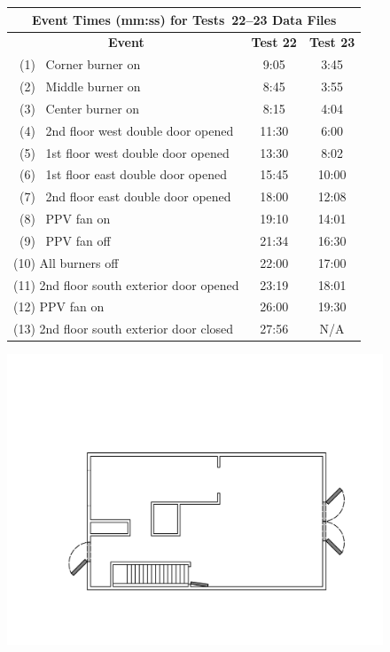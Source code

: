 \documentclass[12pt,oneside]{book}
\begin{document}
\begin{figure}[!ht]
\begin{minipage}[b]{0.8\columnwidth}
	\begin{flushleft}
	\small
	\begin{tabular}{lcc}
	\multicolumn{3}{c}{Event Times (mm:ss) for Tests~22--23 Data Files} \\
	\toprule
	\multicolumn{1}{c}{\textbf{Event}} 			& \textbf{Test 22}	& \textbf{Test 23} \\
	\midrule
	~(1)~  Corner burner on 					& 	9:05 			&	 3:45		\\
	~(2)~  Middle burner on 					&   8:45	  		&	 3:55		\\
	~(3)~  Center burner on 					&   8:15	  		&	 4:04		\\
	~(4)~  2nd floor west double door opened 	&   11:30	  		&    6:00		\\
	~(5)~  1st floor west double door opened 	&	13:30	  		&    8:02 	 	\\
	~(6)~  1st floor east double door opened 	&   15:45		  	&    10:00		\\
	~(7)~  2nd floor east double door opened	&   18:00		  	&    12:08		\\
	~(8)~  PPV fan on 							&   19:10		  	&    14:01		\\
	~(9)~  PPV fan off              			&   21:34		  	&    16:30		\\
	(10) All burners off 						&   22:00		  	&    17:00		\\
	(11) 2nd floor south exterior door opened 	&   23:19		  	&    18:01		\\
	(12) PPV fan on 	 						&   26:00		  	&    19:30		\\
	(13) 2nd floor south exterior door closed   &   27:56		  	&    N/A		\\
	\bottomrule
	\end{tabular}
	\end{flushleft}
\end{minipage}
\begin{minipage}[b]{0.9\columnwidth}
	\vspace{15pt}
	\centering
	\includegraphics[width=0.84\columnwidth]{../Figures/Floor_Plans/West_Structure_2nd_Floor_Test_22}

\end{minipage}
\end{figure}
\end{document}
